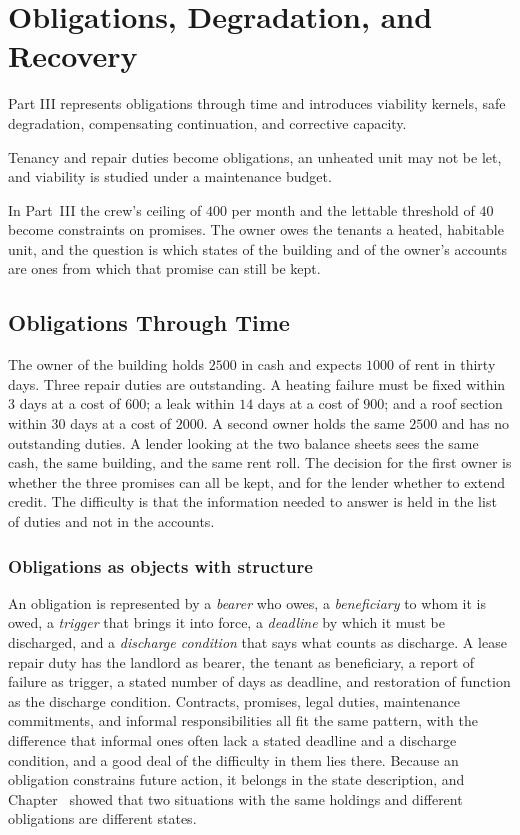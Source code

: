 \part{Obligations, Degradation, and Recovery}
\label{part:III}

Part III represents obligations through time and introduces viability kernels, safe degradation, compensating continuation, and corrective capacity.

\begin{housing}Tenancy and repair duties become obligations, an unheated unit may not be let, and viability is studied under a maintenance budget.\end{housing}


In Part~III the crew's ceiling of $400$ per month and the lettable threshold of $40$ become constraints on promises. The owner owes the tenants a heated, habitable unit, and the question is which states of the building and of the owner's accounts are ones from which that promise can still be kept.

\chapter{Obligations Through Time}\label{ch:11}

The owner of the building holds $2500$ in cash and expects $1000$ of rent in thirty days. Three repair duties are outstanding. A heating failure must be fixed within $3$ days at a cost of $600$; a leak within $14$ days at a cost of $900$; and a roof section within $30$ days at a cost of $2000$. A second owner holds the same $2500$ and has no outstanding duties. A lender looking at the two balance sheets sees the same cash, the same building, and the same rent roll. The decision for the first owner is whether the three promises can all be kept, and for the lender whether to extend credit. The difficulty is that the information needed to answer is held in the list of duties and not in the accounts.

\section{Obligations as objects with structure}

An obligation is represented by a \emph{bearer} who owes, a \emph{beneficiary} to whom it is owed, a \emph{trigger} that brings it into force, a \emph{deadline} by which it must be discharged, and a \emph{discharge condition} that says what counts as discharge. A lease repair duty has the landlord as bearer, the tenant as beneficiary, a report of failure as trigger, a stated number of days as deadline, and restoration of function as the discharge condition. Contracts, promises, legal duties, maintenance commitments, and informal responsibilities all fit the same pattern, with the difference that informal ones often lack a stated deadline and a discharge condition, and a good deal of the difficulty in them lies there. Because an obligation constrains future action, it belongs in the state description, and Chapter~ showed that two situations with the same holdings and different obligations are different states.

